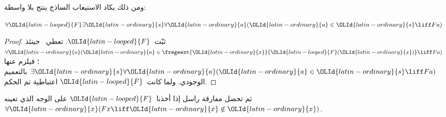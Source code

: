 \documentclass[../../../include/open-logic-section]{subfiles}
\begin{document}
ومن ذلك يكاد الاستيعاب الساذج ينتج بلا واسطة:

\begin{lem}
$\forall \OLId{latin-looped}{F} \exists \OLId{latin-ordinary}{s} \forall \OLId{latin-ordinary}{a} (\OLId{latin-ordinary}{a} \in \OLId{latin-ordinary}{s} \liff Fa)$
\end{lem}

\begin{proof}
ثبّت~$\OLId{latin-looped}{F}$. تعطي~ حينئذ
$\forall \OLId{latin-ordinary}{a} (\OLId{latin-ordinary}{a} \in \fregeext{\OLId{latin-ordinary}{x}}{\OLId{latin-looped}{F}(\OLId{latin-ordinary}{x})} \liff Fa)$؛ فيلزم عنها
$\exists \OLId{latin-ordinary}{s}\forall \OLId{latin-ordinary}{a}(\OLId{latin-ordinary}{a} \in \OLId{latin-ordinary}{s} \liff Fa)$ بالتعميم الوجودي. ولما كانت~$\OLId{latin-looped}{F}$
اعتباطية تم الحكم.
\end{proof}

ثم تحصل مفارقة راسل إذا أخذنا~$\OLId{latin-looped}{F}$ على الوجه الذي تعينه
$\forall \OLId{latin-ordinary}{x}(Fx \liff \OLId{latin-ordinary}{x} \notin \OLId{latin-ordinary}{x})$.
\end{document}
